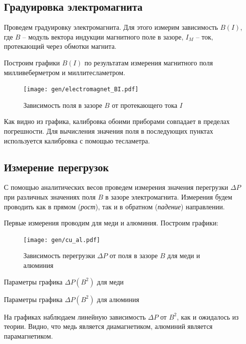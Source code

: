 \documentclass[12pt,a4paper]{article}
\begin{document}
	\subsection*{Градуировка электромагнита}
	
	Проведем градуировку электромагнита. Для этого измерим зависимость $B(I)$, где $B$ -- модуль вектора индукции магнитного поле в зазоре, $I_M$ -- ток, протекающий через обмотки магнита.
	
	Построим графики $B(I)$ по результатам измерения магнитного поля милливеберметром и миллитесламетром.
	
	\begin{figure}[H]
		\texttt{[image: gen/electromagnet\_BI.pdf]}
		\caption{Зависимость поля в зазоре $B$ от протекающего тока $I$}
	\end{figure}
	
	Как видно из графика, калибровка обоими приборами совпадает в пределах погрешности. Для вычисления значения поля в последующих пунктах используется калибровка с помощью тесламетра.
	
	\subsection*{Измерение перегрузок}
	
	С помощью аналитических весов проведем измерения значения перегрузки $\Delta P$ при различных значениях поля $B$ в зазоре электромагнита. Измерения будем проводить как в прямом (\textit{рост}), так и в обратном (\textit{падение}) направлении.
	
	Первые измерения проводим для меди и алюминия. Построим графики:
	
	\begin{figure}[H]
		\texttt{[image: gen/cu\_al.pdf]}
		\caption{Зависимость перегрузки $\Delta P$ от поля в зазоре $B$ для меди и алюминия}
	\end{figure}

	\begin{table}[h]
		\caption{Параметры графика $\Delta P(B^2)$ для меди}
		
	\end{table}
	
	\begin{table}[h]
		\caption{Параметры графика $\Delta P(B^2)$ для алюминия}
		
	\end{table}
		
	На графиках наблюдаем линейную зависимость $\Delta P$ от $B^2$, как и ожидалось из теории.
	Видно, что медь является диамагнетиком, алюминий является парамагнетиком.
	
\end{document}
